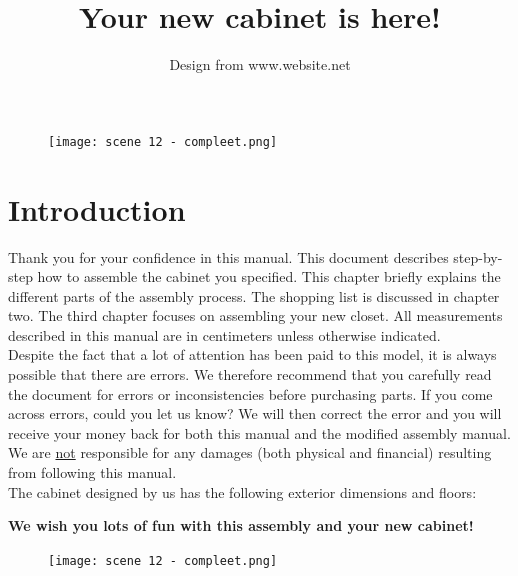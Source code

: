 \documentclass{article}
\title{Your new cabinet is here!}
\author{Design from www.website.net}
\begin{document}
\maketitle

\begin{figure}[h!]
    \centering
    \texttt{[image: scene 12 - compleet.png]}
\end{figure}

\clearpage
\newpage

\tableofcontents

\clearpage
\newpage

\section{Introduction}

Thank you for your confidence in this manual. This document describes step-by-step how to assemble the cabinet you specified. This chapter briefly explains the different parts of the assembly process. The shopping list is discussed in chapter two. The third chapter focuses on assembling your new closet. All measurements described in this manual are in centimeters unless otherwise indicated. \\

Despite the fact that a lot of attention has been paid to this model, it is always possible that there are errors. We therefore recommend that you carefully read the document for errors or inconsistencies before purchasing parts. If you come across errors, could you let us know? We will then correct the error and you will receive your money back for both this manual and the modified assembly manual. We are \underline{not} responsible for any damages (both physical and financial) resulting from following this manual. \\

The cabinet designed by us has the following exterior dimensions and floors: \\

 

\begin{center}
\textbf{We wish you lots of fun with this assembly and your new cabinet!}
\end{center}

\begin{figure}[h!]
    \centering
    \texttt{[image: scene 12 - compleet.png]}
\end{figure}

\clearpage
\newpage
\end{document}
